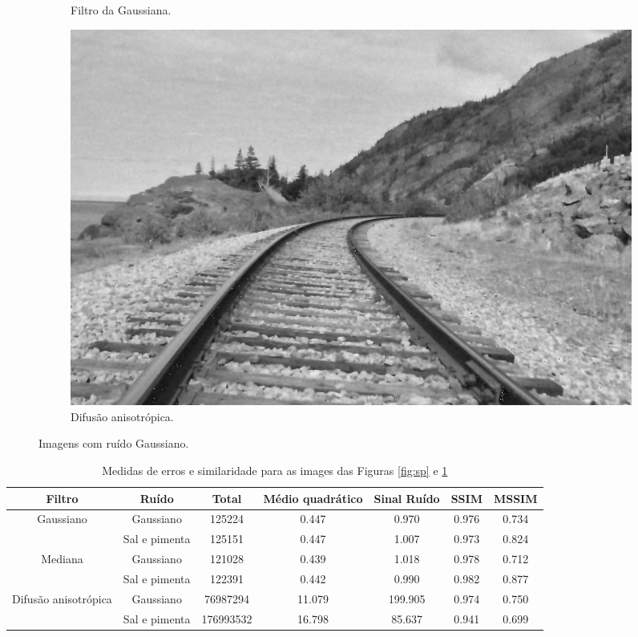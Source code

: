 \documentclass[10pt,a4paper]{article}
\begin{document}
\begin{figure}[!ht]
\begin{subfigure}[ht]{0.45\textwidth}
        \caption{Filtro da Gaussiana.}
    \end{subfigure}
    \qquad
    \begin{subfigure}[ht]{0.45\textwidth}
        \includegraphics[width=\textwidth]{ga_aniso.jpg}
        \caption{Difusão anisotrópica.}
    \end{subfigure}
    \caption{Imagens com ruído Gaussiano.}
    \label{fig:ga}
\end{figure}

\begin{table}[!ht]
\begin{tabular}{ccccccc}
\toprule
         Filtro                         & Ruído         & Total     & Médio quadrático & Sinal Ruído & SSIM  & MSSIM\\ \midrule
\multirow{2}{*}{Gaussiano}              & Gaussiano     & 125224    & 0.447            & 0.970       & 0.976 & 0.734\\
                                        & Sal e pimenta & 125151    & 0.447            & 1.007       & 0.973 & 0.824\\\midrule
\multirow{2}{*}{Mediana}                & Gaussiano     & 121028    & 0.439            & 1.018       & 0.978 & 0.712\\
                                        & Sal e pimenta & 122391    & 0.442            & 0.990       & 0.982 & 0.877\\\midrule
\multirow{2}{*}{Difusão anisotrópica}   & Gaussiano     & 76987294  & 11.079           & 199.905     & 0.974 & 0.750\\
                                        & Sal e pimenta & 176993532 & 16.798           & 85.637      & 0.941 & 0.699\\\bottomrule
\end{tabular}
\caption{Medidas de erros e similaridade para as images das Figuras \ref{fig:sp} e \ref{fig:ga}}
\label{tab:results}
\end{table}
\end{document}
